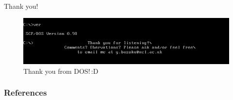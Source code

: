\documentclass{beamer}
\begin{document}
\begin{frame}{Thank you!}
\begin{figure}
	\begin{center}
	  \includegraphics[width=\textwidth]{dosthanks2.png}
	  \caption{Thank you from DOS!\,:D}
	\end{center}
  \end{figure}
\end{frame}
\begin{frame}[allowframebreaks]
	\frametitle{References}
	\nocite{*}
	
	
\end{frame}
\end{document}
